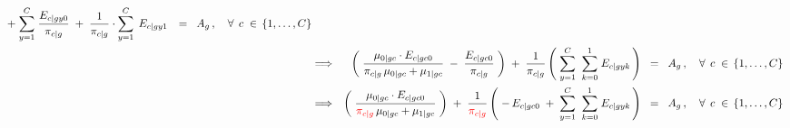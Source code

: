 \begin{eqnarray*}
		\; + \;
		\overset{C}{\underset{y=1}{\sum}}\;
		\dfrac{E_{c \vert gy0}}{\pi_{c \vert g}}
		\; + \;
		\dfrac{1}{\pi_{c \vert g}}
		\cdot
			\overset{C}{\underset{y=1}{\sum}}\;
			\,E_{c \vert gy1}\,
		\;\; = \;\;
		A_{g}\,,
		\quad\forall\;\,c\;\in\,\{1,\ldots,C\}
\\
&\Longrightarrow&
		\left(\;
			\dfrac{\mu_{0 \vert gc} \cdot E_{c \vert gc0}}{
				\pi_{c \vert g}\,\mu_{0 \vert gc} + \mu_{1\vert gc}
				}
			\; - \;
			\dfrac{E_{c \vert gc0}}{\pi_{c \vert g}}
		\;\right)
		\; + \;
		\dfrac{1}{\pi_{c \vert g}}
		\left(\;
			\overset{C}{\underset{y=1}{\sum}}\;\;
			\overset{1}{\underset{k=0}{\sum}}\;
			E_{c \vert gyk}
		\,\right)
		\;\; = \;\;
		A_{g}\,,
		\quad\forall\;\,c\;\in\,\{1,\ldots,C\}
\\
&\Longrightarrow&
		\left(\;
			\dfrac{\mu_{0 \vert gc} \cdot E_{c \vert gc0}}{
				{\color{red}\pi_{c \vert g}}\,\mu_{0 \vert gc} + \mu_{1\vert gc}
				}
		\;\right)
		\; + \;
		\dfrac{1}{\color{red}\pi_{c \vert g}}
		\left(\;
			-\,E_{c \vert gc0}
			\; + \;
			\overset{C}{\underset{y=1}{\sum}}\;\;
			\overset{1}{\underset{k=0}{\sum}}\;
			E_{c \vert gyk}
		\,\right)
		\;\; = \;\;
		A_{g}\,,
		\quad\forall\;\,c\;\in\,\{1,\ldots,C\}
\end{eqnarray*}

